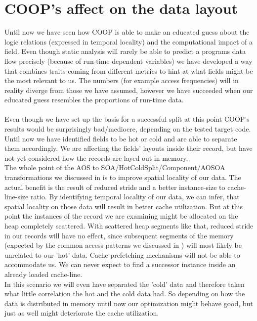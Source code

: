 \section{COOP's affect on the data layout}\label{affect_on_data_layout}
Until now we have seen how COOP is able to make an educated guess about the logic relations (expressed in temporal locality) and the computational impact of a field. Even though static analysis will rarely be able to predict a programs data flow precisely (because of run-time dependent variables) we have developed a way that combines traits coming from different metrics to hint at what fields might be the most relevant to us. The numbers (for example access frequencies) will in reality diverge from those we have assumed, however we have succeeded when our educated guess resembles the proportions of run-time data.\\\\
Even though we have set up the basis for a successful split at this point COOP's results would be surprisingly bad/mediocre, depending on the tested target code. Until now we have identified fields to be hot or cold and are able to separate them accordingly. We are affecting the fields' layouts inside their record, but have not yet considered how the records are layed out in memory.\\
The whole point of the AOS to SOA/HotColdSplit/Component/AOSOA transformations we discussed in  is to improve spatial locality of our data. The actual benefit is the result of reduced stride and a better instance-size to cache-line-size ratio. By identifying temporal locality of our data, we can infer, that spatial locality on those data will result in better cache utilization. But at this point the instances of the record we are examining might be allocated on the heap completely scattered. With scattered heap segments like that, reduced stride in our records will have no effect, since subsequent segments of the memory (expected by the common access patterns we discussed in ) will most likely be unrelated to our 'hot' data. Cache prefetching mechanisms will not be able to accommodate us. We can never expect to find a successor instance inside an already loaded cache-line.\\ 
In this scenario we will even have separated the 'cold' data and therefore taken what little correlation the hot and the cold data had. So depending on how the data is distributed in memory until now our optimization might behave good, but just as well might deteriorate the cache utilization.\\\\
